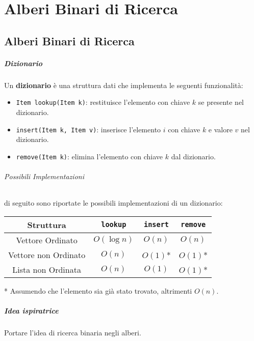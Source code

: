 \chapter{Alberi Binari di Ricerca}
\thispagestyle{chapterInit}
\section{Alberi Binari di Ricerca}
    \paragraph{Dizionario} \begin{definition}
        Un \textbf{dizionario} è una struttura dati che implementa le seguenti funzionalità: 
        \begin{itemize}
            \item \texttt{Item lookup(Item k)}: restituisce l'elemento con chiave $k$ se presente nel dizionario.
            \item \texttt{insert(Item k, Item v)}: inserisce l'elemento $i$ con chiave $k$ e valore $v$ nel dizionario.
            \item \texttt{remove(Item k)}: elimina l'elemento con chiave $k$ dal dizionario.
        \end{itemize}
    \end{definition}
    \subparagraph{Possibili Implementazioni} di seguito sono riportate le possibili implementazioni di un dizionario:
        \begin{table}[H]
            \centering
            \begin{tabular}{|c|c|c|c|}
                \hline
                \textbf{Struttura} & \textbf{\texttt{lookup}} & \textbf{\texttt{insert}} & \textbf{\texttt{remove}} \\
                \hline
                Vettore Ordinato & $O(\log n)$ & $O(n)$ & $O(n)$ \\
                \hline
                Vettore non Ordinato & $O(n)$ & $O(1)$* & $O(1)$* \\
                \hline
                Lista non Ordinata & $O(n)$ & $O(1)$ & $O(1)$* \\
                \hline
            \end{tabular}
        \end{table}
        * Assumendo che l'elemento sia già stato trovato, altrimenti $O(n)$.
    \paragraph{Idea ispiratrice} Portare l'idea di ricerca binaria negli alberi.
